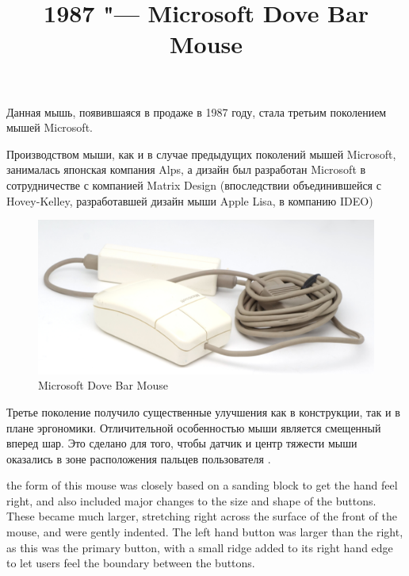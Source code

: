 \documentclass[11pt, a4paper]{article}
\begin{document}
\title{1987 "--- Microsoft Dove Bar Mouse}
\date{}
\maketitle
{}

Данная мышь, появившаяся в продаже в 1987 году, стала третьим поколением мышей Microsoft. 




Производством мыши, как и в случае предыдущих поколений мышей Microsoft, занималась японская компания Alps, а дизайн был  разработан Microsoft в сотрудничестве с компанией Matrix Design (впоследствии объединившейся с Hovey-Kelley, разработавшей дизайн мыши Apple Lisa, в компанию IDEO)

\begin{figure}[h]
   \centering
    \includegraphics[scale=0.5]{1987_microsoft_dove_bar_mouse/pic_30.jpg}
    \caption{Microsoft Dove Bar Mouse}
    \label{fig:MicrosoftDoveBarPic}
\end{figure}

Третье поколение получило существенные улучшения как в конструкции, так и в плане эргономики. Отличительной особенностью мыши является смещенный вперед шар. Это сделано для того, чтобы датчик и центр тяжести мыши оказались в зоне расположения пальцев пользователя .

the form of this mouse
was closely based on a sanding block to get the hand feel right, and also included
major changes to the size and shape of the buttons. These became much larger,
stretching right across the surface of the front of the mouse, and were gently
indented. The left hand button was larger than the right, as this was the primary
button, with a small ridge added to its right hand edge to let users feel the boundary
between the buttons. 
\end{document}

